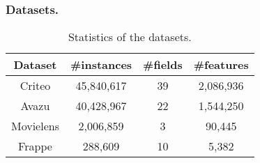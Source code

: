 \documentclass[letterpaper]{article} \usepackage{aaai20}  \usepackage{times}  \usepackage{helvet} \usepackage{courier}  \usepackage[hyphens]{url}  \usepackage{graphicx} \urlstyle{rm} \def\UrlFont{\rm}  \usepackage{graphicx}  \frenchspacing  \setlength{\pdfpagewidth}{8.5in}  \setlength{\pdfpageheight}{11in}
\begin{document}
\subsubsection{Datasets.}
\begin{table}
\small
	\captionsetup{labelfont=bf}
	\centering
		\caption{Statistics of the datasets.}
			\label{tab:datasets}
	\begin{tabular}{cccc}
		\toprule[1pt]
		Dataset&\!\#instances\!&\!\#fields\!&\!\#features\!\\
		\midrule[0.5pt] 
		Criteo&45,840,617&39&2,086,936\\
		Avazu&40,428,967&22&1,544,250\\
		Movielens&2,006,859&3&90,445\\
		Frappe&288,609&10&5,382\\
		\bottomrule[1pt]
	\end{tabular}
\end{table}
\end{document}
